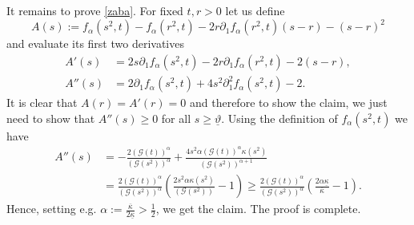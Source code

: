 \documentclass[11pt, a4paper, reqno]{amsart}
\numberwithin{equation}{section}
\newcommand{\thetah}{\hat\thet}
\newcommand{\thet}{\vartheta}
\newcommand{\dx}{\,{\rm d} {x}}
\newcommand{\G}{\mathcal{G}}
\newcommand{\al}{\alpha}
\newcommand{\intO}[1]{\int_{\Omega} #1 \dx}
\newcommand{\ff}{f}
\renewcommand{\ggg}{g}
\newcommand{\hhh}{h}
\newcommand{\tmin}{\underline{\thet}}
\begin{document}
It remains to prove \eqref{zaba}. For fixed $t,r >0$ let us  define
$$
A(s):=\ff_\alpha(s^2,t)-\ff_\alpha(r^2,t)-2r\partial_1\ff_\alpha(r^2,t)(s-r) -(s-r)^2
$$
and evaluate its first two derivatives
$$
\begin{aligned}
A'(s)&=2s\partial_1\ff_\alpha(s^2,t)-2r\partial_1\ff_\alpha(r^2,t) -2(s-r),\\
A''(s)&=2\partial_1\ff_\alpha(s^2,t)+4s^2\partial^2_{1}\ff_\alpha(s^2,t)-2.
\end{aligned}
$$
It is clear that $A(r)=A'(r)=0$ and therefore to show the claim, we just need to show that $A''(s)\ge 0$ for all $s\ge \tmin$. Using the definition of $\ff_\alpha(s^2,t)$ we have
$$
\begin{aligned}
A''(s)&= -\frac{2 (\G(t))^{\al}}{(\G(s^2))^{\alpha}} + \frac{4s^2\alpha (\G(t))^{\al} \kappa(s^2)}{(\G(s^2))^{\alpha+1}}\\
 &=\frac{2 (\G(t))^{\al}}{(\G(s^2))^{\alpha}} \left(\frac{2s^2\alpha \kappa(s^2)}{(\G(s^2))}  -1 \right)\ge \frac{2 (\G(t))^{\al}}{(\G(s^2))^{\alpha}} \left(\frac{2\alpha \underline{\kappa}}{\overline{\kappa}}  -1 \right).
\end{aligned}
$$
Hence, setting e.g. $\alpha:=\frac{\overline{\kappa}}{2\underline{\kappa}}>\frac12$, we get the claim. The proof is complete.

%
%
\end{document}
